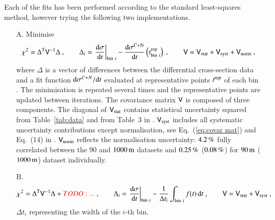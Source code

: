 Each of the fits has been performed according to the standard least-squares method, however trying the following two implementations.

\begin{enumerate}

\item[A.] Minimise
\begin{equation}
\label{eq:chi sq A}
	\chi^2 = \Delta^{\rm T} \mathsf{V}^{-1} \Delta\ ,\qquad
	\Delta_i = \left.{{\rm d}\sigma\over {\rm d} t}\right|_{{\rm bin}\ i} - {{\rm d}\sigma^{\rm C+N}\over{\rm d} t}\left(t^{\rm rep}_{{\rm bin}\ i}\right)\ ,\qquad
	\mathsf{V} = \mathsf{V}_{\rm stat} + \mathsf{V}_{\rm syst} + \mathsf{V}_{\rm norm}\ ,
\end{equation}
where $\Delta$ is a vector of differences between the differential cross-section data and a fit function ${\rm d}\sigma^{C+N}/{\rm d} t$ evaluated at representative points $t^{\rm rep}$ of each bin \cite{lafferty94}. The minimisation is repeated several times and the representative points are updated between iterations. The covariance matrix $\mathsf{V}$ is composed of three components. The diagonal of $\mathsf{V}_{\rm stat}$ contains statistical uncertainty squared from Table~\ref{tab:data} and from Table~3 in \cite{8tev-90m}. $\mathsf{V}_{\rm syst}$ includes all systematic uncertainty contributions except normalisation, see Eq.~(\ref{eq:covar mat}) and Eq.~(14) in \cite{8tev-90m}. $\mathsf{V}_{\rm norm}$ reflects the normalisation uncertainty: $4.2\,{\rm \%}$ fully correlated between the $90$ and $1000\,{\rm m}$ datasets and $0.25\,{\rm \%}$ ($0.08\,{\rm \%}$) for $90\,{\rm m}$ ($1000\,{\rm m}$) dataset individually. 


\item[B.] 
\begin{equation}
\label{eq:chi sq B}
	\chi^2 = \Delta^{\rm T} \mathsf{V}^{-1} \Delta + {\color{red}TODO: ...}\ ,\qquad
	\Delta_i = \left.{{\rm d}\sigma\over {\rm d} t}\right|_{{\rm bin}\ i} - {1\over \Delta t_i} \int_{{\rm bin}\ i} f(t)\,{\rm d} t\ ,\qquad
	\mathsf{V} = \mathsf{V}_{\rm stat} + \mathsf{V}_{\rm syst}\ ,
\end{equation}
$\Delta t_i$ representing the width of the $i$-th bin. 

\end{enumerate}


